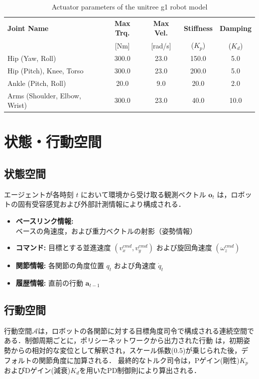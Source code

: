\begin{table}[H]
    \centering
    \caption{Actuator parameters of the unitree g1 robot model}
    \label{tab:g1_actuator_params}
    \small
    \begin{tabularx}{\linewidth}{Xcccc}
        \toprule
        \textbf{Joint Name} & \textbf{Max Trq.} & \textbf{Max Vel.} & \textbf{Stiffness} & \textbf{Damping} \\
         & [Nm] & [rad/s] & ($K_p$) & ($K_d$) \\
        \midrule
        Hip (Yaw, Roll) & 300.0 & 23.0 & 150.0 & 5.0 \\
        Hip (Pitch), Knee, Torso & 300.0 & 23.0 & 200.0 & 5.0 \\
        Ankle (Pitch, Roll) & 20.0 & 9.0 & 20.0 & 2.0 \\
        Arms (Shoulder, Elbow, Wrist) & 300.0 & 23.0 & 40.0 & 10.0 \\
        \bottomrule
    \end{tabularx}
\end{table}

\section{状態・行動空間}

\subsection{状態空間}
エージェントが各時刻 $t$ において環境から受け取る観測ベクトル $\mathbf{o}_t$ は，ロボットの固有受容感覚および外部計測情報により構成される．
\begin{itemize}
    \item \textbf{ベースリンク情報:} ベースの角速度，および重力ベクトルの射影（姿勢情報）
    \item \textbf{コマンド:} 目標とする並進速度 $(v_x^{cmd}, v_y^{cmd})$ および旋回角速度 $(\omega_z^{cmd})$
    \item \textbf{関節情報:} 各関節の角度位置 $q_t$ および角速度 $\dot{q}_t$
    \item \textbf{履歴情報:} 直前の行動 $\mathbf{a}_{t-1}$
\end{itemize}
\subsection{行動空間}
行動空間$\mathcal{A}$は，ロボットの各関節に対する目標角度司令で構成される連続空間である．制御周期ごとに，ポリシーネットワークから出力された行動
は，初期姿勢からの相対的な変位として解釈され，スケール係数(0.5)が乗じられた後，デフォルトの関節角度に加算される．
最終的なトルク司令は，Pゲイン(剛性)$K_{p}$およびDゲイン(減衰)$K_{d}$を用いたPD制御則により算出される．


